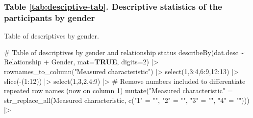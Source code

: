 \documentclass[
  bookmarksnumbered]{article}
\newenvironment{Shaded}{\begin{snugshade}}{\end{snugshade}}
\newcommand{\AttributeTok}[1]{\textcolor[rgb]{0.80,0.80,0.80}{#1}}
\newcommand{\CommentTok}[1]{\textcolor[rgb]{0.50,0.62,0.50}{#1}}
\newcommand{\ConstantTok}[1]{\textcolor[rgb]{0.86,0.64,0.64}{\textbf{#1}}}
\newcommand{\DecValTok}[1]{\textcolor[rgb]{0.86,0.86,0.80}{#1}}
\newcommand{\FunctionTok}[1]{\textcolor[rgb]{0.94,0.94,0.56}{#1}}
\newcommand{\NormalTok}[1]{\textcolor[rgb]{0.80,0.80,0.80}{#1}}
\newcommand{\OtherTok}[1]{\textcolor[rgb]{0.94,0.94,0.56}{#1}}
\newcommand{\SpecialCharTok}[1]{\textcolor[rgb]{0.86,0.64,0.64}{#1}}
\newcommand{\StringTok}[1]{\textcolor[rgb]{0.80,0.58,0.58}{#1}}
\begin{document}
\hypertarget{table-reftabdesciptive-tab.-descriptive-statistics-of-the-participants-by-gender}{%
\subsubsection{Table \ref{tab:desciptive-tab}. Descriptive statistics of the participants by gender}\label{table-reftabdesciptive-tab.-descriptive-statistics-of-the-participants-by-gender}}

Table of descriptives by gender.

\begin{Shaded}
\begin{Highlighting}[]
\CommentTok{\# Table of descriptives by gender and relationship status}
\FunctionTok{describeBy}\NormalTok{(dat.desc }\SpecialCharTok{\textasciitilde{}}\NormalTok{ Relationship }\SpecialCharTok{+}\NormalTok{ Gender,}
           \AttributeTok{mat=}\ConstantTok{TRUE}\NormalTok{,}
           \AttributeTok{digits=}\DecValTok{2}\NormalTok{)  }\SpecialCharTok{|\textgreater{}} 
  \FunctionTok{rownames\_to\_column}\NormalTok{(}\StringTok{"Measured characteristic"}\NormalTok{) }\SpecialCharTok{|\textgreater{}}
  \FunctionTok{select}\NormalTok{(}\DecValTok{1}\NormalTok{,}\DecValTok{3}\SpecialCharTok{:}\DecValTok{4}\NormalTok{,}\DecValTok{6}\SpecialCharTok{:}\DecValTok{9}\NormalTok{,}\DecValTok{12}\SpecialCharTok{:}\DecValTok{13}\NormalTok{) }\SpecialCharTok{|\textgreater{}} 
  \FunctionTok{slice}\NormalTok{(}\SpecialCharTok{{-}}\NormalTok{(}\DecValTok{1}\SpecialCharTok{:}\DecValTok{12}\NormalTok{)) }\SpecialCharTok{|\textgreater{}} 
  \FunctionTok{select}\NormalTok{(}\DecValTok{1}\NormalTok{,}\DecValTok{3}\NormalTok{,}\DecValTok{2}\NormalTok{,}\DecValTok{4}\SpecialCharTok{:}\DecValTok{9}\NormalTok{) }\SpecialCharTok{|\textgreater{}} 
  \CommentTok{\# Remove numbers included to differentiate repeated row names (now on column 1)}
  \FunctionTok{mutate}\NormalTok{(}\StringTok{"Measured characteristic"} \OtherTok{=} \FunctionTok{str\_replace\_all}\NormalTok{(}\StringTok{\textasciigrave{}}\AttributeTok{Measured characteristic}\StringTok{\textasciigrave{}}\NormalTok{,}
                                                     \FunctionTok{c}\NormalTok{(}\StringTok{"1"} \OtherTok{=} \StringTok{""}\NormalTok{, }
                                                       \StringTok{"2"} \OtherTok{=} \StringTok{""}\NormalTok{, }
                                                       \StringTok{"3"} \OtherTok{=} \StringTok{""}\NormalTok{, }
                                                       \StringTok{"4"} \OtherTok{=} \StringTok{""}\NormalTok{))) }\SpecialCharTok{|\textgreater{}} 

\end{Highlighting}
\end{Shaded}
\end{document}
